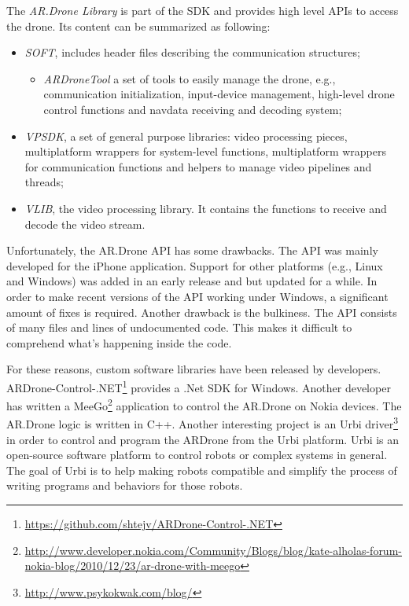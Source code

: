 The \textit{AR.Drone Library} is part of the SDK and provides high level APIs to access the drone.
Its content can be summarized as following:
\begin{itemize}
\item \textit{SOFT}, includes header files describing the communication structures;
	\begin{itemize}
		\item \textit{ARDroneTool} a set of tools to easily manage the drone, e.g., communication initialization, input-device management, high-level drone control functions and navdata receiving and decoding system;
	\end{itemize}
\item \textit{VPSDK}, a set of general purpose libraries: video processing pieces, multiplatform wrappers for system-level functions, multiplatform wrappers for communication functions and helpers to manage video pipelines and threads;
\item \textit{VLIB}, the video processing library. It contains the functions to receive and decode the video stream.
\end{itemize}

Unfortunately, the AR.Drone API has some drawbacks.
The API was mainly developed for the iPhone application.
Support for other platforms (e.g., Linux and Windows) was added in an early release and but updated for a while.
In order to make recent versions of the API working under Windows, a significant amount of fixes is required.
Another drawback is the bulkiness.
The API consists of many files and lines of undocumented code.
This makes it difficult to comprehend what's happening inside the code.

For these reasons, custom software libraries have been released by developers.
ARDrone-Control-.NET\footnote{\url{https://github.com/shtejv/ARDrone-Control-.NET}} provides a .Net SDK for Windows.
Another developer has written a MeeGo\footnote{\url{http://www.developer.nokia.com/Community/Blogs/blog/kate-alholas-forum-nokia-blog/2010/12/23/ar-drone-with-meego}} application to control the AR.Drone on Nokia devices. The AR.Drone logic is written in C++.
Another interesting project is an Urbi driver\footnote{\url{http://www.psykokwak.com/blog/}} in order to control and program the ARDrone from the Urbi platform.
Urbi is an open-source software platform to control robots or complex systems in general. The goal of Urbi is to help making robots compatible and simplify the process of writing programs and behaviors for those robots. 
